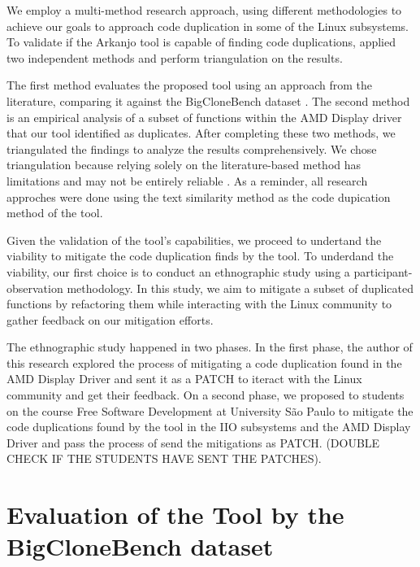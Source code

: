 We employ a multi-method research approach, using different methodologies to achieve our goals
to approach code duplication in some of the Linux subsystems. 
To validate if the Arkanjo tool is capable of finding code duplications, 
applied two independent methods and perform triangulation on the results. 

The first method evaluates the proposed tool using an approach from the literature, 
comparing it against the BigCloneBench dataset \citep{bigclonebench}. 
The second method is an empirical analysis of a subset of functions within the 
AMD Display driver that our tool identified as duplicates. After completing these two 
methods, we triangulated the findings to analyze the results comprehensively. 
We chose triangulation because relying solely on the literature-based method has 
limitations and may not be entirely reliable \citep{bigfail, litreview}. As a reminder, 
all research approches were done using the text similarity method as the 
code dupication method of the tool.

Given the validation of the tool's capabilities, we proceed to undertand the viability 
to mitigate the code duplication finds by the tool. 
To underdand the viability, our first choice is to conduct an ethnographic study using 
a participant-observation methodology. 
In this study, we aim to mitigate a subset of duplicated functions by refactoring them 
while interacting with the Linux community to gather feedback on our mitigation efforts. 

The ethnographic study happened in two phases. 
In the first phase, the author of this research explored the process of mitigating
a code duplication found in the AMD Display Driver and sent it as a PATCH to iteract with the
Linux community and get their feedback. On a second phase, we proposed to students on the 
course Free Software Development at University São Paulo to mitigate the code duplications found 
by the tool in the IIO subsystems and the AMD Display Driver and pass the process of send the mitigations as PATCH.
(DOUBLE CHECK IF THE STUDENTS HAVE SENT THE PATCHES). 


\section{Evaluation of the Tool by the BigCloneBench dataset}

